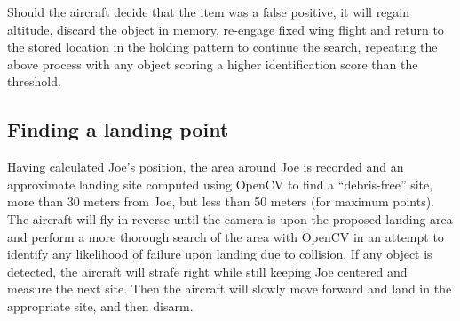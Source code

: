 Should the aircraft decide that the item was a false positive, it will regain altitude, discard the object in memory, re-engage fixed wing flight and return to the stored location in the holding pattern to continue the search, repeating the above process with any object scoring a higher identification score than the threshold. 

\subsection{Finding a landing point}
Having calculated Joe's position, the area around Joe is recorded and an approximate landing site computed using OpenCV to find a  ``debris-free'' site, more than 30 meters from Joe, but less than 50 meters (for maximum points). The aircraft will fly in reverse until the camera is upon the proposed landing area and perform a more thorough search of the area with OpenCV in an attempt to identify any likelihood of failure upon landing due to collision. If any object is detected, the aircraft will strafe right while still keeping Joe centered and measure the next site. Then the aircraft will slowly move forward and land in the appropriate site, and then disarm.